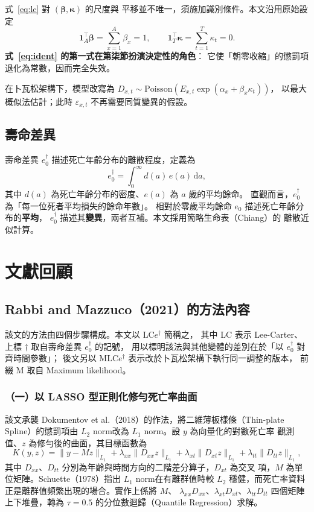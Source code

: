 \documentclass[UTF8, fontset=macnew, a4paper, 12pt]{ctexart}
\newcommand{\edag}{e_0^{\dagger}}
\newcommand{\LCe}{\mathrm{LC}e^{\dagger}}
\begin{document}
式~\eqref{eq:lc} 對 $(\boldsymbol{\beta},\boldsymbol{\kappa})$ 的尺度與
平移並不唯一，須施加識別條件。本文沿用原始設定
\begin{equation}\label{eq:ident}
\mathbf{1}_A^{\!\top}\boldsymbol{\beta}=\sum_{x=1}^{A}\beta_x=1,
\qquad
\mathbf{1}_T^{\!\top}\boldsymbol{\kappa}=\sum_{t=1}^{T}\kappa_t=0 .
\end{equation}
\textbf{式~\eqref{eq:ident} 的第一式在第柒節扮演決定性的角色}：
它使「朝零收縮」的懲罰項退化為常數，因而完全失效。

在卜瓦松架構下，模型改寫為
$D_{x,t}\sim\text{Poisson}\!\left(E_{x,t}\exp(\alpha_x+\beta_x\kappa_t)\right)$，
以最大概似法估計；此時 $\varepsilon_{x,t}$ 不再需要同質變異的假設。

\subsection{壽命差異}

壽命差異 $\edag$ 描述死亡年齡分布的離散程度，定義為
\begin{equation}\label{eq:edag}
\edag=\int_0^{\infty} d(a)\,e(a)\,\mathrm{d}a ,
\end{equation}
其中 $d(a)$ 為死亡年齡分布的密度、$e(a)$ 為 $a$ 歲的平均餘命。
直觀而言，$\edag$ 為「每一位死者平均損失的餘命年數」。
相對於零歲平均餘命 $e_0$ 描述死亡年齡分布的\textbf{平均}，
$\edag$ 描述其\textbf{變異}，兩者互補。本文採用簡略生命表（Chiang）的
離散近似計算。

\section{文獻回顧}

\subsection{Rabbi and Mazzuco（2021）的方法內容}

該文的方法由四個步驟構成。本文以 $\LCe$ 簡稱之，
其中 LC 表示 Lee-Carter、上標 $\dagger$ 取自壽命差異 $\edag$ 的記號，
用以標明該法與其他變體的差別在於「以 $\edag$ 對齊時間參數」；
後文另以 M$\LCe$ 表示改於卜瓦松架構下執行同一調整的版本，
前綴 M 取自 Maximum likelihood。

\subsubsection{（一）以 LASSO 型正則化修勻死亡率曲面}

該文承襲 Dokumentov et al.（2018）的作法，將二維薄板樣條（Thin-plate
Spline）的懲罰項由 $L_2$ norm改為 $L_1$ norm。設 $y$ 為向量化的對數死亡率
觀測值、$z$ 為修勻後的曲面，其目標函數為
\begin{equation}\label{eq:K}
K(y,z)=\|y-Mz\|_{L_1}+\lambda_{xx}\|D_{xx}z\|_{L_1}
+\lambda_{xt}\|D_{xt}z\|_{L_1}+\lambda_{tt}\|D_{tt}z\|_{L_1},
\end{equation}
其中 $D_{xx}$、$D_{tt}$ 分別為年齡與時間方向的二階差分算子，$D_{xt}$ 為交叉
項，$M$ 為單位矩陣。Schuette（1978）指出 $L_1$ norm在有離群值時較 $L_2$
穩健，而死亡率資料正是離群值頻繁出現的場合。實作上係將 $M$、
$\lambda_{xx}D_{xx}$、$\lambda_{xt}D_{xt}$、$\lambda_{tt}D_{tt}$ 四個矩陣
上下堆疊，轉為 $\tau=0.5$ 的分位數迴歸（Quantile Regression）求解。
\end{document}
